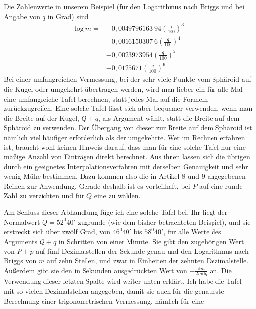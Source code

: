 \par\indent Die Zahlenwerte in unserem Beispiel (für den Logarithmus nach Briggs und bei Angabe von \(q\) in Grad) sind
\[
\begin{aligned}
\log m={}&-0{,}0049796163\ 94(\frac{q}{100})^3\\
&-0{,}0016150307\ 6(\frac{q}{100})^4\\
&-0{,}0023973954(\frac{q}{100})^5\\
&-0{,}0125671(\frac{q}{100})^6
\end{aligned}
\]
\indent Bei einer umfangreichen Vermessung, bei der sehr viele Punkte vom Sphäroid auf die Kugel oder umgekehrt übertragen werden, wird man lieber ein für alle Mal eine umfangreiche Tafel berechnen, statt jedes Mal auf die Formeln zurückzugreifen. Eine solche Tafel lässt sich aber bequemer verwenden, wenn man die Breite auf der Kugel, \(Q+q\), als Argument wählt, statt die Breite auf dem Sphäroid zu verwenden. Der Übergang von dieser zur Breite auf dem Sphäroid ist nämlich viel häufiger erforderlich als der umgekehrte. Wer im Rechnen erfahren ist, braucht wohl keinen Hinweis darauf, dass man für eine solche Tafel nur eine mäßige Anzahl von Einträgen direkt berechnet. Aus ihnen lassen sich die übrigen durch ein geeignetes Interpolationsverfahren mit derselben Genauigkeit und sehr wenig Mühe bestimmen. Dazu kommen also die in Artikel 8 und 9 angegebenen Reihen zur Anwendung. Gerade deshalb ist es vorteilhaft, bei \(P\) auf eine runde Zahl zu verzichten und für \(Q\) eine zu wählen.

Am Schluss dieser Abhandlung füge ich eine solche Tafel bei. Ihr liegt der Normalwert \(Q=52^0 40'\) zugrunde (wie dem bisher betrachteten Beispiel), und sie erstreckt sich über zwölf Grad, von \(46^0 40'\) bis \(58^0 40'\), für alle Werte des Arguments \(Q+q\) in Schritten von einer Minute. Sie gibt den zugehörigen Wert von \(P+p\) auf fünf Dezimalstellen der Sekunde genau und den Logarithmus nach Briggs von \(m\) auf zehn Stellen, und zwar in Einheiten der zehnten Dezimalstelle. Außerdem gibt sie den in Sekunden ausgedrückten Wert von \(-\tfrac{\mathrm{d}m}{2m\mathrm{d}q}\) an. Die Verwendung dieser letzten Spalte wird weiter unten erklärt. Ich habe die Tafel mit so vielen Dezimalstellen angegeben, damit sie auch für die genaueste Berechnung einer trigonometrischen Vermessung, nämlich für eine

